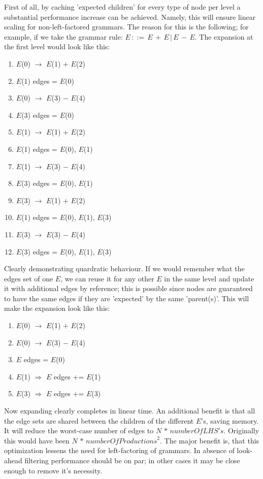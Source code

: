 \documentclass[a4paper,10pt]{article}
\begin{document}
First of all, by caching 'expected children' for every type of node per level a substantial performance increase can be achieved. Namely, this will ensure linear scaling for non-left-factored grammars. The reason for this is the following; for example, if we take the grammar rule: $E\,::=\,E\,+\,E\,|\,E\,-\,E$. The expansion at the first level would look like this:
\begin{enumerate}
 \setlength{\itemsep}{0pt}
 \setlength{\parskip}{0pt}
 \setlength{\parsep}{0pt}
 
 \item $E$(0) $\rightarrow$ $E$(1) $+$ $E$(2)
 \item $E$(1) edges = {$E$(0)}
 \item $E$(0) $\rightarrow$ $E$(3) $-$ $E$(4)
 \item $E$(3) edges = {$E$(0)}
 \item $E$(1) $\rightarrow$ $E$(1) $+$ $E$(2)
 \item $E$(1) edges = {$E$(0), $E$(1)}
 \item $E$(1) $\rightarrow$ $E$(3) $-$ $E$(4)
 \item $E$(3) edges = {$E$(0), $E$(1)}
 \item $E$(3) $\rightarrow$ $E$(1) $+$ $E$(2)
 \item $E$(1) edges = {$E$(0), $E$(1), $E$(3)}
 \item $E$(3) $\rightarrow$ $E$(3) $-$ $E$(4)
 \item $E$(3) edges = {$E$(0), $E$(1), $E$(3)}
\end{enumerate}
Clearly demonstrating quardratic behaviour. If we would remember what the edges set of one $E$, we can reuse it for any other $E$ in the same level and update it with additional edges by reference; this is possible since nodes are guaranteed to have the same edges if they are 'expected' by the same 'parent(s)'. This will make the expansion look like this:
\begin{enumerate}
 \setlength{\itemsep}{0pt}
 \setlength{\parskip}{0pt}
 \setlength{\parsep}{0pt}
 
 \item $E$(0) $\rightarrow$ $E$(1) $+$ $E$(2)
 \item $E$(0) $\rightarrow$ $E$(3) $-$ $E$(4)
 \item $E$ edges = {$E$(0)}
 \item $E$(1) $\Rightarrow$ $E$ edges += $E$(1)
 \item $E$(3) $\Rightarrow$ $E$ edges += $E$(3)
\end{enumerate}
Now expanding clearly completes in linear time. An additional benefit is that all the edge sets are shared between the children of the different $E$'s, saving memory. It will reduce the worst-case number of edges to $N\,*\,\mathit{numberOfLHS's}$. Originally this would have been $N\,*\,\mathit{numberOfProductions}^{2}$. The major benefit is, that this optimization lessens the need for left-factoring of grammars. In absence of look-ahead filtering performance should be on par; in other cases it may be close enough to remove it's necessity.
\end{document}
